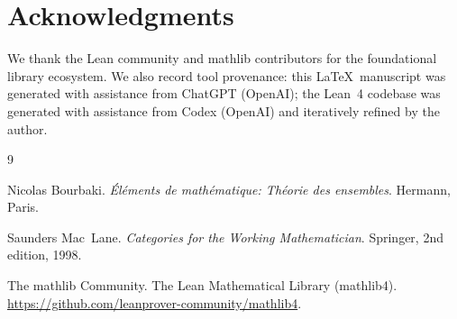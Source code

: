 \documentclass[11pt]{article}
\begin{document}
\section*{Acknowledgments}
We thank the Lean community and mathlib contributors for the foundational library ecosystem. We also record tool provenance: this \LaTeX\ manuscript was generated with assistance from ChatGPT (OpenAI); the Lean~4 codebase was generated with assistance from Codex (OpenAI) and iteratively refined by the author.

\begin{thebibliography}{9}

Nicolas Bourbaki.
\newblock \emph{\'{E}l\'{e}ments de math\'{e}matique: Th\'{e}orie des ensembles}.
\newblock Hermann, Paris.

Saunders Mac~Lane.
\newblock \emph{Categories for the Working Mathematician}.
\newblock Springer, 2nd edition, 1998.

The mathlib Community.
\newblock The Lean Mathematical Library (mathlib4).
\newblock \url{https://github.com/leanprover-community/mathlib4}.

\end{thebibliography}
\end{document}
